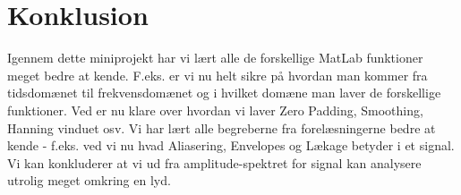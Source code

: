 \documentclass[12pt, letterpaper]{article}
\begin{document}
\begin{figure}[!h]
           \begin{floatrow}
       
           \end{floatrow}
\end{figure}

\newpage


\section{Konklusion}
Igennem dette miniprojekt har vi lært alle de forskellige MatLab funktioner meget bedre at kende. F.eks. er vi nu helt sikre på hvordan man kommer fra tidsdomænet til frekvensdomænet og i hvilket domæne man laver de forskellige funktioner. Ved er nu klare over hvordan vi laver Zero Padding, Smoothing, Hanning vinduet osv. 
Vi har lært alle begreberne fra forelæsningerne bedre at kende - f.eks. ved vi nu hvad Aliasering, Envelopes og Lækage betyder i et signal. 
Vi kan konkluderer at vi ud fra amplitude-spektret for signal kan analysere utrolig meget omkring en lyd. 
\end{document}
